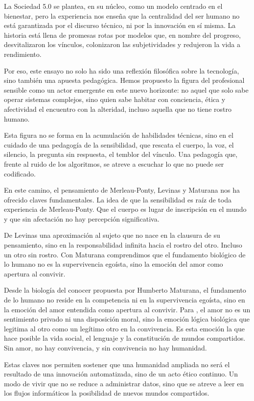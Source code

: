 \documentclass[spanish]{textolivre}
\begin{document}
La Sociedad 5.0 se plantea, en su núcleo, como un modelo centrado en el bienestar, pero la experiencia nos enseña que la centralidad del ser humano no está garantizada por el discurso técnico, ni por la innovación en sí misma. La historia está llena de promesas rotas por modelos que, en nombre del progreso, desvitalizaron los vínculos, colonizaron las subjetividades y redujeron la vida a rendimiento.

Por eso, este ensayo no solo ha sido una reflexión filosófica sobre la tecnología, sino también una apuesta pedagógica. Hemos propuesto la figura del profesional sensible como un actor emergente en este nuevo horizonte: no aquel que solo sabe operar sistemas complejos, sino quien sabe habitar con conciencia, ética y afectividad el encuentro con la alteridad, incluso aquella que no tiene rostro humano.

Esta figura no se forma en la acumulación de habilidades técnicas, sino en el cuidado de una pedagogía de la sensibilidad, que rescata el cuerpo, la voz, el silencio, la pregunta sin respuesta, el temblor del vínculo. Una pedagogía que, frente al ruido de los algoritmos, se atreve a escuchar lo que no puede ser codificado.

En este camino, el pensamiento de Merleau-Ponty, Levinas y Maturana nos ha ofrecido claves fundamentales. La idea de que la sensibilidad es raíz de toda experiencia de Merleau-Ponty. Que el cuerpo es lugar de inscripción en el mundo y que sin afectación no hay percepción significativa.

De Levinas una aproximación al sujeto que no nace en la clausura de su pensamiento, sino en la responsabilidad infinita hacia el rostro del otro. Incluso un otro sin rostro. Con Maturana comprendimos que el fundamento biológico de lo humano no es la supervivencia egoísta, sino la emoción del amor como apertura al convivir.

Desde la biología del conocer propuesta por Humberto Maturana, el fundamento de lo humano no reside en la competencia ni en la supervivencia egoísta, sino en la emoción del amor entendida como apertura al convivir. Para \textcite{maturana1997}, el amor no es un sentimiento privado ni una disposición moral, sino la emoción lógica biológica que legitima al otro como un legítimo otro en la convivencia. Es esta emoción la que hace posible la vida social, el lenguaje y la constitución de mundos compartidos. Sin amor, no hay convivencia, y sin convivencia no hay humanidad.

Estas claves nos permiten sostener que una humanidad ampliada no será el resultado de una innovación automatizada, sino de un acto ético continuo. Un modo de vivir que no se reduce a administrar datos, sino que se atreve a leer en los flujos informáticos la posibilidad de nuevos mundos compartidos.
\end{document}
